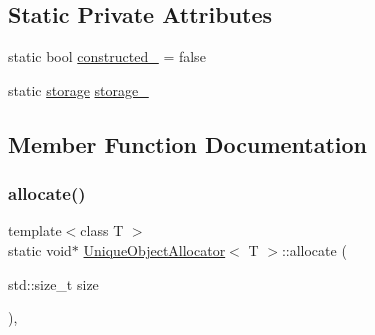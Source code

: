 \subsection*{Static Private Attributes}
\begin{DoxyCompactItemize}
\item 
static bool \mbox{\hyperlink{class_unique_object_allocator_abc28a41fb39ba4adcb23bc21e4121d63}{constructed\+\_\+}} = false
\item 
static \mbox{\hyperlink{union_unique_object_allocator_1_1storage}{storage}} \mbox{\hyperlink{class_unique_object_allocator_ad684f842780e3afc1fdbacabc0d7cd5b}{storage\+\_\+}}
\end{DoxyCompactItemize}


\subsection{Member Function Documentation}
\mbox{\label{class_unique_object_allocator_a7baf5a708dcd516ce694499687e0cdc2}} 
\subsubsection{\texorpdfstring{allocate()}{allocate()}}
{\footnotesize\ttfamily template$<$class T $>$ \\
static void$\ast$ \mbox{\hyperlink{class_unique_object_allocator}{Unique\+Object\+Allocator}}$<$ T $>$\+::allocate (\begin{DoxyParamCaption}\item[{std\+::size\+\_\+t}]{size }\end{DoxyParamCaption})\hspace{0.3cm}{\ttfamily [inline]}, {\ttfamily [static]}}

